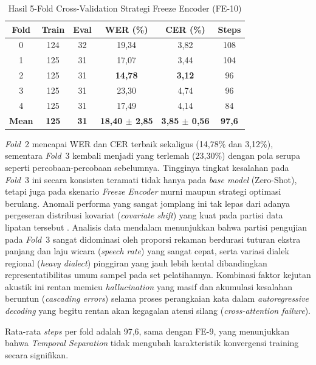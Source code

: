 \begin{table}[H]
\centering
\caption{Hasil 5-Fold Cross-Validation Strategi Freeze Encoder (FE-10)}
\label{tab:fe_cv_results}
\begin{tabular}{|c|c|c|c|c|c|}
\hline
\textbf{Fold} & \textbf{Train} & \textbf{Eval} & \textbf{WER (\%)} & \textbf{CER (\%)} & \textbf{Steps} \\
\hline
0 & 124 & 32 & 19,34 & 3,82 & 108 \\
\hline
1 & 125 & 31 & 17,07 & 3,44 & 104 \\
\hline
2 & 125 & 31 & \textbf{14,78} & \textbf{3,12} & 96 \\
\hline
3 & 125 & 31 & 23,30 & 4,74 & 96 \\
\hline
4 & 125 & 31 & 17,49 & 4,14 & 84 \\
\hline
\hline
\textbf{Mean} & \textbf{125} & \textbf{31} & \textbf{18,40 $\pm$ 2,85} & \textbf{3,85 $\pm$ 0,56} & \textbf{97,6} \\
\hline
\end{tabular}
\end{table}

\textit{Fold}~2 mencapai WER dan CER terbaik sekaligus (14,78\% dan 3,12\%), sementara \textit{Fold}~3 kembali menjadi yang terlemah (23,30\%) dengan pola serupa seperti percobaan-percobaan sebelumnya. Tingginya tingkat kesalahan pada \textit{Fold}~3 ini secara konsisten teramati tidak hanya pada \textit{base model} (Zero-Shot), tetapi juga pada skenario \textit{Freeze Encoder} murni maupun strategi optimasi berulang. Anomali performa yang sangat jomplang ini tak lepas dari adanya pergeseran distribusi kovariat (\textit{covariate shift}) yang kuat pada partisi data lipatan tersebut \cite{sugiyama2007covariate}. Analisis data mendalam menunjukkan bahwa partisi pengujian pada \textit{Fold}~3 sangat didominasi oleh proporsi rekaman berdurasi tuturan ekstra panjang dan laju wicara (\textit{speech rate}) yang sangat cepat, serta variasi dialek regional (\textit{heavy dialect}) pinggiran yang jauh lebih kental dibandingkan representatibilitas umum sampel pada set pelatihannya. Kombinasi faktor kejutan akustik ini rentan memicu \textit{hallucination} yang masif dan akumulasi kesalahan beruntun (\textit{cascading errors}) selama proses perangkaian kata dalam \textit{autoregressive decoding} yang begitu rentan akan kegagalan atensi silang (\textit{cross-attention failure}).

Rata-rata \textit{steps} per fold adalah 97,6, sama dengan FE-9, yang menunjukkan bahwa \textit{Temporal Separation} tidak mengubah karakteristik konvergensi training secara signifikan.


